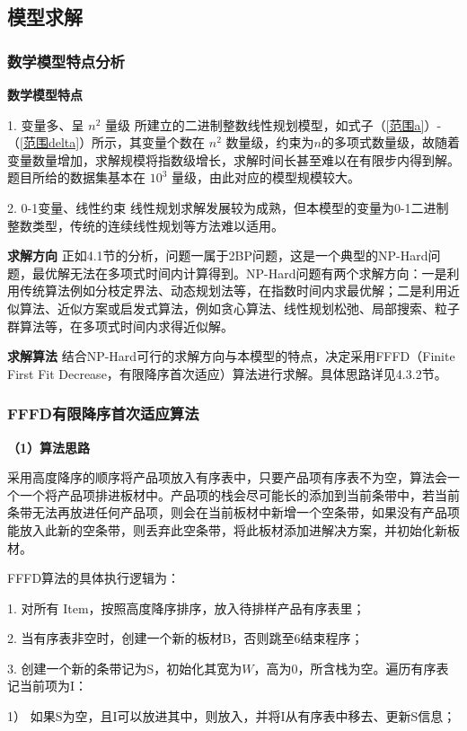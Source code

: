 \documentclass[bwprint]{gmcmthesis}
\begin{document}
\subsection{模型求解}
	
\subsubsection{数学模型特点分析}
	\textbf{数学模型特点} 
	
	1. 变量多、呈 $ n^2 $ 量级 \quad 所建立的二进制整数线性规划模型，如式子（\ref{范围a}）-（\ref{范围delta}）所示，其变量个数在 $ n^2 $ 数量级，约束为$ n $的多项式数量级，故随着变量数量增加，求解规模将指数级增长，求解时间长甚至难以在有限步内得到解。 题目所给的数据集基本在 $ 10^3 $ 量级，由此对应的模型规模较大。
	
	2. 0-1变量、线性约束 \quad	线性规划求解发展较为成熟，但本模型的变量为0-1二进制整数类型，传统的连续线性规划等方法难以适用。
	
	\textbf{求解方向} \quad 正如4.1节的分析，问题一属于2BP问题，这是一个典型的NP-Hard问题，最优解无法在多项式时间内计算得到。NP-Hard问题有两个求解方向：一是利用传统算法例如分枝定界法、动态规划法等，在指数时间内求最优解；二是利用近似算法、近似方案或启发式算法，例如贪心算法、线性规划松弛、局部搜索、粒子群算法等，在多项式时间内求得近似解。
	
	\textbf{求解算法} \quad 结合NP-Hard可行的求解方向与本模型的特点，决定采用FFFD（Finite First Fit Decrease，有限降序首次适应）算法进行求解。具体思路详见4.3.2节。


\subsubsection{FFFD有限降序首次适应算法}
	\textbf{（1）算法思路}
	
	采用高度降序的顺序将产品项放入有序表中，只要产品项有序表不为空，算法会一个一个将产品项排进板材中。产品项的栈会尽可能长的添加到当前条带中，若当前条带无法再放进任何产品项，则会在当前板材中新增一个空条带，如果没有产品项能放入此新的空条带，则丢弃此空条带，将此板材添加进解决方案，并初始化新板材。
	
	FFFD算法的具体执行逻辑为：
	
	1. 对所有 {\rm Item}，按照高度降序排序，放入待排样产品有序表里；
	
	2. 当有序表非空时，创建一个新的板材B，否则跳至6结束程序；
	
	3. 创建一个新的条带记为S，初始化其宽为$W$，高为0，所含栈为空。遍历有序表记当前项为I：
	
	1） 如果S为空，且I可以放进其中，则放入，并将I从有序表中移去、更新S信息；
	
\end{document}
